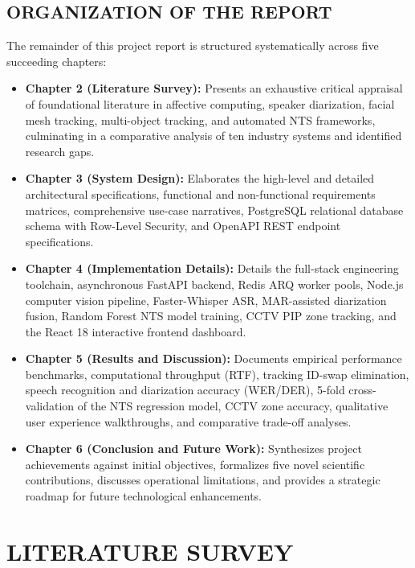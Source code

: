 \documentclass[12pt,a4paper,oneside]{report}
\begin{document}
\section{ORGANIZATION OF THE REPORT}
The remainder of this project report is structured systematically across five succeeding chapters:
\begin{itemize}
    \item \textbf{Chapter 2 (Literature Survey):} Presents an exhaustive critical appraisal of foundational literature in affective computing, speaker diarization, facial mesh tracking, multi-object tracking, and automated NTS frameworks, culminating in a comparative analysis of ten industry systems and identified research gaps.
    \item \textbf{Chapter 3 (System Design):} Elaborates the high-level and detailed architectural specifications, functional and non-functional requirements matrices, comprehensive use-case narratives, PostgreSQL relational database schema with Row-Level Security, and OpenAPI REST endpoint specifications.
    \item \textbf{Chapter 4 (Implementation Details):} Details the full-stack engineering toolchain, asynchronous FastAPI backend, Redis ARQ worker pools, Node.js computer vision pipeline, Faster-Whisper ASR, MAR-assisted diarization fusion, Random Forest NTS model training, CCTV PIP zone tracking, and the React 18 interactive frontend dashboard.
    \item \textbf{Chapter 5 (Results and Discussion):} Documents empirical performance benchmarks, computational throughput (RTF), tracking ID-swap elimination, speech recognition and diarization accuracy (WER/DER), 5-fold cross-validation of the NTS regression model, CCTV zone accuracy, qualitative user experience walkthroughs, and comparative trade-off analyses.
    \item \textbf{Chapter 6 (Conclusion and Future Work):} Synthesizes project achievements against initial objectives, formalizes five novel scientific contributions, discusses operational limitations, and provides a strategic roadmap for future technological enhancements.
\end{itemize}

\chapter{LITERATURE SURVEY}
\end{document}
